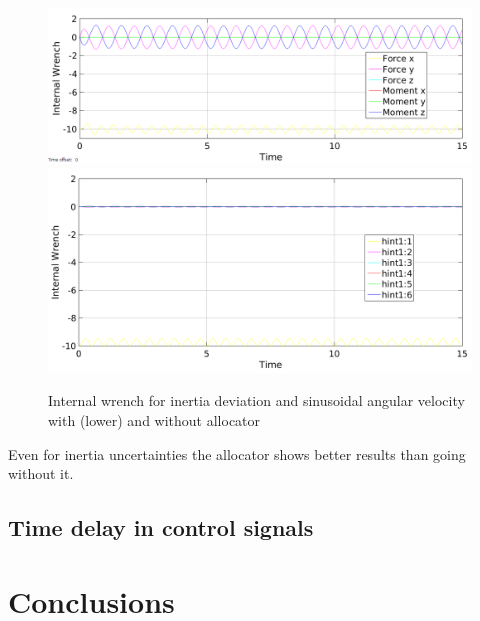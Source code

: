 \documentclass[conference]{IEEEtran}
\begin{document}
\begin{figure}
\includegraphics[width=\linewidth]{IntDevNullSinus}
\includegraphics[width=\linewidth]{IntDevAlloSinus}
\caption{Internal wrench for inertia deviation and sinusoidal angular velocity with (lower) and without allocator}
\label{IntDevPT1}
\end{figure}
Even for inertia uncertainties the allocator shows better results than going without it.
\subsection{Time delay in control signals}



\section{Conclusions}








\end{document}
